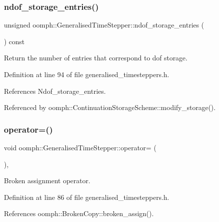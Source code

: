 \subsubsection{\texorpdfstring{ndof\+\_\+storage\+\_\+entries()}{ndof\_storage\_entries()}}
{\footnotesize\ttfamily unsigned oomph\+::\+Generalised\+Time\+Stepper\+::ndof\+\_\+storage\+\_\+entries (\begin{DoxyParamCaption}{ }\end{DoxyParamCaption}) const\hspace{0.3cm}{\ttfamily [inline]}}



Return the number of entries that correspond to dof storage. 



Definition at line 94 of file generalised\+\_\+timesteppers.\+h.



References Ndof\+\_\+storage\+\_\+entries.



Referenced by oomph\+::\+Continuation\+Storage\+Scheme\+::modify\+\_\+storage().

\mbox{\label{classoomph_1_1GeneralisedTimeStepper_af89420c5b7f70db01b9f568687c1dc83}} 
\subsubsection{\texorpdfstring{operator=()}{operator=()}}
{\footnotesize\ttfamily void oomph\+::\+Generalised\+Time\+Stepper\+::operator= (\begin{DoxyParamCaption}\item[{const \hyperlink{classoomph_1_1GeneralisedTimeStepper}{Generalised\+Time\+Stepper} \&}]{ }\end{DoxyParamCaption})\hspace{0.3cm}{\ttfamily [inline]}, {\ttfamily [protected]}}



Broken assignment operator. 



Definition at line 86 of file generalised\+\_\+timesteppers.\+h.



References oomph\+::\+Broken\+Copy\+::broken\+\_\+assign().



